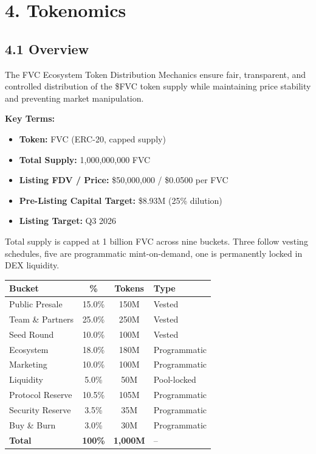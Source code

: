 \documentclass[
  paper=a4,
  ,captions=tableheading
]{scrartcl}
\providecommand{\tightlist}{%
  \setlength{\itemsep}{0pt}\setlength{\parskip}{0pt}}
\begin{document}
\section{4. Tokenomics}\label{token-distribution-mechanics}

\subsection{4.1 Overview}\label{overview-1}

The FVC Ecosystem Token Distribution Mechanics ensure fair, transparent,
and controlled distribution of the \$FVC token supply while maintaining
price stability and preventing market manipulation.

\textbf{Key Terms:}

\begin{itemize}
\tightlist
\item
  \textbf{Token:} FVC (ERC-20, capped supply)
\item
  \textbf{Total Supply:} 1,000,000,000 FVC
\item
  \textbf{Listing FDV / Price:} \$50,000,000 / \$0.0500 per FVC
\item
  \textbf{Pre-Listing Capital Target:} \$8.93M (25\% dilution)
\item
  \textbf{Listing Target:} Q3 2026
\end{itemize}

Total supply is capped at 1 billion FVC across nine buckets. Three follow vesting schedules, five are programmatic mint-on-demand, one is permanently locked in DEX liquidity.

\begin{center}
\begin{tabular}{lccl}
\toprule
\textbf{Bucket} & \textbf{\%} & \textbf{Tokens} & \textbf{Type} \\
\midrule
Public Presale & 15.0\% & 150M & Vested \\
Team \& Partners & 25.0\% & 250M & Vested \\
Seed Round & 10.0\% & 100M & Vested \\
Ecosystem & 18.0\% & 180M & Programmatic \\
Marketing & 10.0\% & 100M & Programmatic \\
Liquidity & 5.0\% & 50M & Pool-locked \\
Protocol Reserve & 10.5\% & 105M & Programmatic \\
Security Reserve & 3.5\% & 35M & Programmatic \\
Buy \& Burn & 3.0\% & 30M & Programmatic \\
\midrule
\textbf{Total} & \textbf{100\%} & \textbf{1,000M} & -- \\
\bottomrule
\end{tabular}
\end{center}
\end{document}
